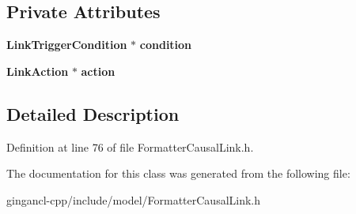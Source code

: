 \subsection*{Private Attributes}
\begin{CompactItemize}
\item 
{\bf LinkTriggerCondition} $\ast$ {\bf condition}\label{classbr_1_1pucrio_1_1telemidia_1_1ginga_1_1ncl_1_1model_1_1link_1_1FormatterCausalLink_13d1d5a38ec688a3d69d8de077dedb25}

\item 
{\bf LinkAction} $\ast$ {\bf action}\label{classbr_1_1pucrio_1_1telemidia_1_1ginga_1_1ncl_1_1model_1_1link_1_1FormatterCausalLink_8acc81b15391cd2899393c351d759517}

\end{CompactItemize}


\subsection{Detailed Description}




Definition at line 76 of file FormatterCausalLink.h.

The documentation for this class was generated from the following file:\begin{CompactItemize}
\item 
gingancl-cpp/include/model/FormatterCausalLink.h\end{CompactItemize}
